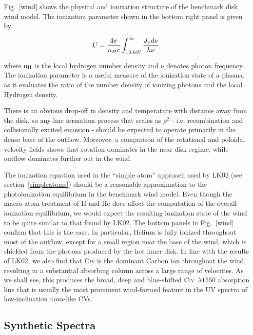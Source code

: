 \documentclass[preprint, a4paper, 11pt]{aastex}
\begin{document}
Fig.~\ref{wind} shows the physical and ionization structure 
of the benchmark disk wind model. The ionization parameter shown in the bottom
right panel is given by

\begin{equation}
U = \frac{4\pi}{n_H c}\int_{13.6{\rm{eV}}}^{\infty}\frac{{J_{\nu}d\nu}}{h\nu},
\end{equation}
 
\noindent where $\rm{n_H}$ is the local hydrogen number density and $\nu$ denotes photon 
frequency. The ionization parameter is a useful measure of the ionization state of a plasma, 
as it evaluates the ratio of the number density of ionizing photons and the local 
Hydrogen density.


There is an obvious drop-off in density
and temperature with distance away from the disk, so any line
formation process that scales as $\rho^2$ - i.e. recombination and
collisionally excited emission - should be expected to operate
primarily in the dense base of the outflow. Moreover, a comparison of
the rotational and poloidal velocity fields shows that rotation
dominates in the near-disk regime, while outflow dominates further out
in the wind. 

The ionization equation used in the ``simple atom'' approach used by
LK02 (see section~\ref{simpleatoms}) should be a reasonable approximation to
the photoionization equilibrium in the benchmark wind model. Even
though the macro-atom treatment of H and He does affect the 
computation of the overall ionization equilibrium, we would expect the
resulting ionization state of the wind to be quite similar to that
found by LK02. The bottom panels in Fig.~\ref{wind} confirm that this
is the case. In particular, Helium is fully ionized
throughout most of the outflow, except for a small region near the
base of the wind, which is shielded from the photons produced by the
hot inner disk. In line with the results of LK02, we also find
that C\textsc{iv} is the dominant Carbon ion throughout the wind,
resulting in a substantial absorbing column across a large range of
velocities. As we shall see, this produces the broad, deep and
blue-shifted C\textsc{iv}~$\lambda1550$ absorption line that
is usually the most prominent wind-formed feature in the UV spectra of
low-inclination nova-like CVs.

\subsection{Synthetic Spectra}
\label{modela_spectrum}
\end{document}
